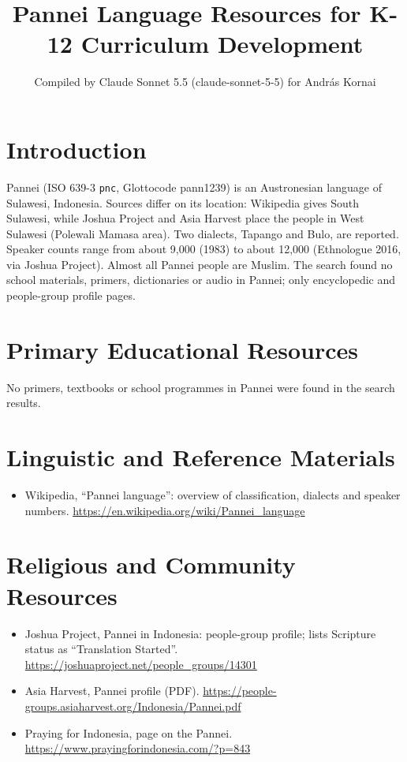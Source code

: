 \documentclass[12pt]{article}
\title{Pannei Language Resources for K-12 Curriculum Development}
\author{Compiled by Claude Sonnet 5.5 (claude-sonnet-5-5) for Andr\'as Kornai}
\date{}
\begin{document}
\maketitle

\section{Introduction}
Pannei (ISO 639-3 \texttt{pnc}, Glottocode pann1239) is an Austronesian language of Sulawesi, Indonesia. Sources differ on its location: Wikipedia gives South Sulawesi, while Joshua Project and Asia Harvest place the people in West Sulawesi (Polewali Mamasa area). Two dialects, Tapango and Bulo, are reported. Speaker counts range from about 9,000 (1983) to about 12,000 (Ethnologue 2016, via Joshua Project). Almost all Pannei people are Muslim. The search found no school materials, primers, dictionaries or audio in Pannei; only encyclopedic and people-group profile pages.

\section{Primary Educational Resources}
No primers, textbooks or school programmes in Pannei were found in the search results.

\section{Linguistic and Reference Materials}
\begin{itemize}
\item Wikipedia, ``Pannei language'': overview of classification, dialects and speaker numbers. \url{https://en.wikipedia.org/wiki/Pannei_language}
\end{itemize}

\section{Religious and Community Resources}
\begin{itemize}
\item Joshua Project, Pannei in Indonesia: people-group profile; lists Scripture status as ``Translation Started''. \url{https://joshuaproject.net/people_groups/14301}
\item Asia Harvest, Pannei profile (PDF). \url{https://people-groups.asiaharvest.org/Indonesia/Pannei.pdf}
\item Praying for Indonesia, page on the Pannei. \url{https://www.prayingforindonesia.com/?p=843}
\end{itemize}
\end{document}
